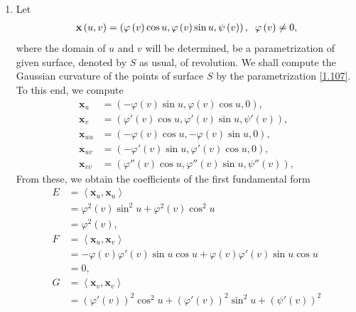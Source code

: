 \documentclass[a4paper]{article}
\numberwithin{equation}{section}
\begin{document}
\begin{enumerate}
\item Let 
\begin{align}
\label{1.107}
\mathbf{x}\left( {u,v} \right) = \left( {\varphi \left( v \right)\cos u,\varphi \left( v \right)\sin u,\psi \left( v \right)} \right),\hspace{0.2cm} \varphi \left(v\right) \ne 0,
\end{align}
where the domain of $u$ and $v$ will be determined, be a parametrization of given surface, denoted by $S$ as usual, of revolution. We shall compute the Gaussian curvature of the points of surface $S$ by the parametrization \eqref{1.107}. To this end, we compute 
\begin{align}
{\mathbf{x}_u} &= \left( { - \varphi \left( v \right)\sin u,\varphi \left( v \right)\cos u,0} \right),\\
{\mathbf{x}_v} &= \left( {\varphi '\left( v \right)\cos u,\varphi '\left( v \right)\sin u,\psi '\left( v \right)} \right),\\
{\mathbf{x}_{uu}} &= \left( { - \varphi \left( v \right)\cos u, - \varphi \left( v \right)\sin u,0} \right),\\
{\mathbf{x}_{uv}} &= \left( { - \varphi '\left( v \right)\sin u,\varphi '\left( v \right)\cos u,0} \right),\\
{\mathbf{x}_{vv}} &= \left( {\varphi ''\left( v \right)\cos u,\varphi ''\left( v \right)\sin u,\psi ''\left( v \right)} \right),
\end{align} 
From these, we obtain the coefficients of the first fundamental form
\begin{align}
E &= \left\langle {{\mathbf{x}_u},{\mathbf{x}_u}} \right\rangle \\
 &= {\varphi ^2}\left( v \right){\sin ^2}u + {\varphi ^2}\left( v \right){\cos ^2}u\\
 &= {\varphi ^2}\left( v \right),\\
F &= \left\langle {{\mathbf{x}_u},{\mathbf{x}_v}} \right\rangle \\
 &=  - \varphi \left( v \right)\varphi '\left( v \right)\sin u\cos u + \varphi \left( v \right)\varphi '\left( v \right)\sin u\cos u\\
 &= 0,\\
G &= \left\langle {{\mathbf{x}_v},{\mathbf{x}_v}} \right\rangle \\
& = {\left( {\varphi '\left( v \right)} \right)^2}{\cos ^2}u + {\left( {\varphi '\left( v \right)} \right)^2}{\sin ^2}u + {\left( {\psi '\left( v \right)} \right)^2}\\

\end{align}
\end{enumerate}
\end{document}
